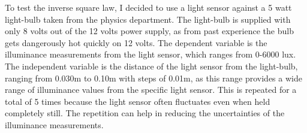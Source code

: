 \documentclass[a4paper,12pt]{article}
\begin{document}







To test the inverse square law, I decided to use a light sensor against a 5 watt light-bulb taken from the physics department. The light-bulb is supplied with only 8 volts out of the 12 volts power supply, as from past experience the bulb gets dangerously hot quickly on 12 volts. The dependent variable is the illuminance measurements from the light sensor, which ranges from 0-6000 lux. The independent variable is the distance of the light sensor from the light-bulb, ranging from 0.030m to 0.10m with steps of 0.01m, as this range provides a wide range of illuminance values from the specific light sensor. This is repeated for a total of 5 times because the light sensor often fluctuates even when held completely still. The repetition can help in reducing the uncertainties of the illuminance measurements.
\end{document}
